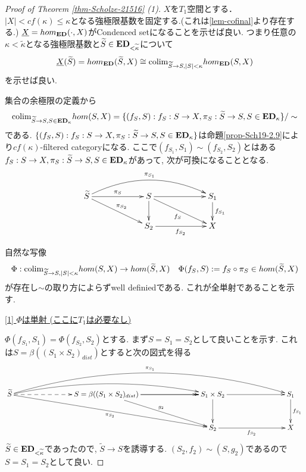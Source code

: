 \documentclass[dvipdfmx,a4paper,11pt]{article}
\newcommand{\colim}{{\rm colim}}
\theoremstyle{definition}
\begin{document}
\begin{proof}[Proof of Theorem \ref{thm-Scholze-21516} (1)]
$X$を$T_1$空間とする． 
$|X| < cf(\kappa) \le \kappa$となる強極限基数を固定する.(これは\ref{lem-cofinal}より存在する.)
$\underline{X} = hom_{{\bf ED}}(\cdot, X)$がCondenced setになることを示せば良い.
つまり任意の$\kappa<\widetilde{\kappa}$となる強極限基数と$\widetilde{S} \in {\bf ED}_{< \widetilde{\kappa}}$について
$$
\underline{X}(\widetilde{S})=hom_{{\bf ED}}(\widetilde{S}, X)
\cong
\colim_{\widetilde{S} \to S, |S|<\kappa}hom_{{\bf ED}}(S,X)
$$
を示せば良い.

集合の余極限の定義から
$$
\colim_{\widetilde{S} \to S, S \in {\bf ED}_{\kappa}}hom(S,X)
=
\{ (f_{S}, S) : f_S : S \to X, \pi_{S}: \widetilde{S} \to S, S \in {\bf ED}_{\kappa}\}/\sim
$$
である.
$\{ (f_{S}, S) : f_S : S \to X, \pi_{S}: \widetilde{S} \to S, S \in {\bf ED}_{\kappa}\}
$は命題\ref{prop-Sch19-2.9}により$cf(\kappa)$-filtered categoryになる. 
ここで$(f_{S_1}, S_1) \sim (f_{S_2}, S_2)$とはある$f_S : S \to X, \pi_{S}: \widetilde{S} \to S, S \in {\bf ED}_{\kappa}$があって, 次が可換になることとなる.
\begin{equation*}
\xymatrix@C=60pt@R=20pt{
\widetilde{S}\ar@{->}[r]^{\pi_S} \ar@/^20pt/[rr]^{\pi_{S_{1}}}\ar@{->}[rd]^{\pi_{S_2}}
&S\ar@{->}[d]  \ar@{->}[r] \ar@{->}[rd]_{f_S}
& S_1\ar@{->}[d]^{f_{S_1}}
\\
&S_2 \ar@{->}[r]_{f_{S_2}} 
&X
 \\   
}
\end{equation*}

自然な写像
\begin{equation}
\Phi : \colim_{\widetilde{S} \to S, |S|<\kappa}hom(S,X)
\to hom(\widetilde{S}, X)
\quad
\Phi(f_{S}, S):=  f_S \circ \pi_S \in hom(\widetilde{S}, X)
\end{equation}
が存在し$\sim$の取り方によらずwell definiedである.
これが全単射であることを示す.

\underline{[1] $\Phi$は単射 (ここに$T_1$は必要なし) }

$\Phi(f_{S_1}, S_1) = \Phi(f_{S_2}, S_2)$とする.
まず$S=S_1=S_2$として良いことを示す. 
これは$S = \beta((S_1 \times S_2)_{dist})$とすると次の図式を得る
\begin{equation*}
\xymatrix@C=80pt@R=30pt{
\widetilde{S}\ar@{-->}[r] \ar@/^30pt/[rrr]^{\pi_{S_{1}}}
\ar@/^15pt/[rr]\ar@{->}[rrd]_{\pi_{S_2}}
& S=\beta((S_1 \times S_2)_{dist})
\ar@{->}[r] \ar@{->>}[r]\ar@{->}[rd]^{g_2}
&S_1 \times S_2\ar@{->}[d]  \ar@{->}[r] 
& S_1\ar@{->}[d]^{f_{S_1}}
\\
&
&S_2 \ar@{->}[r]_{f_{S_2}} 
&X
 \\   
}
\end{equation*} 
$\widetilde{S} \in {\bf ED}_{< \widetilde{\kappa}}$であったので, 
$\widetilde{S} \to S$を誘導する.
$(S_2,f_2) \sim (S, g_2)$であるので$S=S_1=S_2$として良い.


\end{proof}
\end{document}
